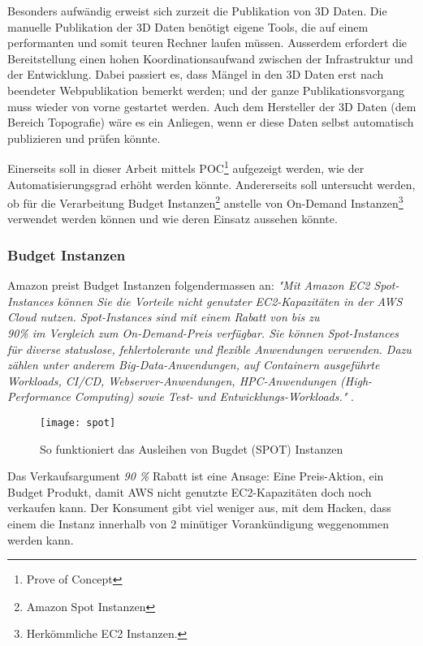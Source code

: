 Besonders aufwändig erweist sich zurzeit die Publikation von 3D Daten. Die manuelle Publikation
der 3D Daten benötigt eigene Tools, die auf einem performanten und somit teuren Rechner laufen
müssen. Ausserdem erfordert die Bereitstellung einen hohen Koordinationsaufwand zwischen der
Infrastruktur und der Entwicklung. Dabei passiert es, dass Mängel in den 3D Daten erst nach
beendeter Webpublikation bemerkt werden; und der ganze Publikationsvorgang muss wieder von
vorne gestartet werden.
Auch dem Hersteller der 3D Daten (dem Bereich Topografie) wäre es ein Anliegen, wenn er diese
Daten selbst automatisch publizieren und prüfen könnte.

Einerseits soll in dieser Arbeit mittels POC\footnote{Prove of Concept} aufgezeigt werden, wie der Automatisierungsgrad erhöht werden könnte. Andererseits soll untersucht werden, ob für die Verarbeitung Budget Instanzen\footnote{Amazon Spot Instanzen} anstelle von On-Demand Instanzen\footnote{Herkömmliche EC2 Instanzen.} verwendet werden können und wie deren Einsatz aussehen könnte.

\subsubsection{Budget Instanzen}
Amazon preist Budget Instanzen folgendermassen an: \textit{"Mit Amazon EC2 Spot-Instances können Sie die Vorteile nicht genutzter EC2-Kapazitäten in der AWS Cloud nutzen. Spot-Instances sind mit einem Rabatt von bis zu\\ 90\% im Vergleich zum On-Demand-Preis verfügbar. Sie können Spot-Instances für diverse statuslose, fehlertolerante und flexible Anwendungen verwenden. Dazu zählen unter anderem Big-Data-Anwendungen, auf Containern ausgeführte Workloads, CI/CD, Webserver-Anwendungen, HPC-Anwendungen (High-Performance Computing) sowie Test- und Entwicklungs-Workloads."} \cite{AmazonAWSSpot:1}.


\begin{figure}[H]
	\centering
	\texttt{[image: spot]}
	\caption{So funktioniert das Ausleihen von Bugdet (SPOT) Instanzen}
	\label{fig:spot}
\end{figure}

Das Verkaufsargument \emph{90 \%} Rabatt ist eine Ansage: Eine Preis-Aktion, ein Budget Produkt, damit AWS nicht genutzte EC2-Kapazitäten doch noch verkaufen kann. Der Konsument gibt viel weniger aus, mit dem Hacken, dass einem die Instanz innerhalb von 2 minütiger Vorankündigung weggenommen werden kann.

